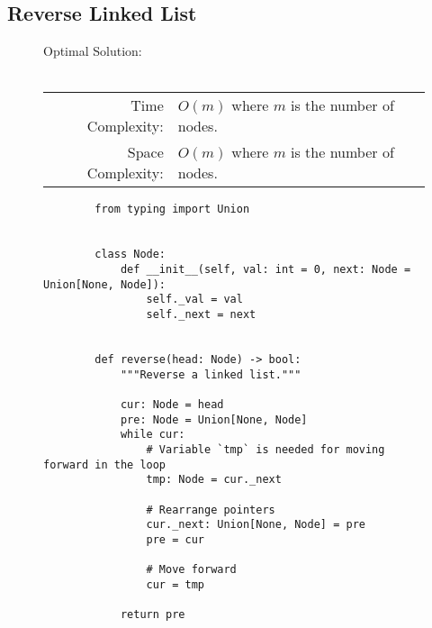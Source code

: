 
\subsection{Reverse Linked List}

\begin{figure}[H]
    Optimal Solution:\\\\
    \begin{tabular}{rl}
        Time Complexity:& \(O(m)\) where \(m\) is the number of nodes.\\
        Space Complexity:& \(O(m)\) where \(m\) is the number of nodes.
    \end{tabular}
\end{figure}

\begin{figure}[H]
    \centering
    \begin{verbatim}
        from typing import Union


        class Node:
            def __init__(self, val: int = 0, next: Node = Union[None, Node]):
                self._val = val
                self._next = next


        def reverse(head: Node) -> bool:
            """Reverse a linked list."""

            cur: Node = head
            pre: Node = Union[None, Node]
            while cur:
                # Variable `tmp` is needed for moving forward in the loop
                tmp: Node = cur._next

                # Rearrange pointers
                cur._next: Union[None, Node] = pre
                pre = cur

                # Move forward
                cur = tmp

            return pre
    \end{verbatim}
\end{figure}
